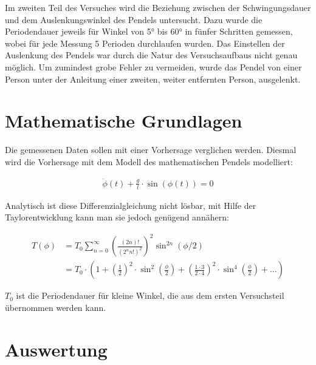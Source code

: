Im zweiten Teil des Versuches wird die Beziehung zwischen der Schwingungsdauer und dem Auslenkungswinkel des Pendels untersucht.
Dazu wurde die Periodendauer jeweils für Winkel von 5° bis 60° in fünfer Schritten gemessen,
wobei für jede Messung 5 Perioden durchlaufen wurden.
Das Einstellen der Auslenkung des Pendels war durch die Natur des Versuchsaufbaus nicht genau möglich.
Um zumindest grobe Fehler zu vermeiden, wurde das Pendel von einer Person unter der Anleitung einer zweiten, weiter entfernten Person, ausgelenkt.

\section{Mathematische Grundlagen}

Die gemessenen Daten sollen mit einer Vorhersage verglichen werden.
Diesmal wird die Vorhersage mit dem Modell des mathematischen Pendels modelliert:

\begin{align}
	\ddot{\phi}(t) + \frac{g}{l} \cdot \sin ( \phi (t)) = 0
\end{align}

Analytisch ist diese Differenzialgleichung nicht lösbar, mit Hilfe der Taylorentwicklung kann man sie jedoch genügend annähern:

\begin{align}
	T(\phi) & = T_0 \sum_{n=0}^{\infty} \left( \frac{\left(2n\right)!}{\left(2^{n}n!\right)^2} \right)^2 \sin^{2n} \left(\phi /2\right) \\
& = T_0\cdot\left(1+\left(\frac{1}{2}\right)^2 \cdot \sin^2\left(\frac{\phi}{2}\right)+\left(\frac{1\cdot 3}{2\cdot 4}\right)^2 \cdot \sin^4\left(\frac{\phi}{2}\right) + \dots\right)
\end{align}

$T_0$ ist die Periodendauer für kleine Winkel, die aus dem ersten Versuchsteil übernommen werden kann.

\section{Auswertung}

